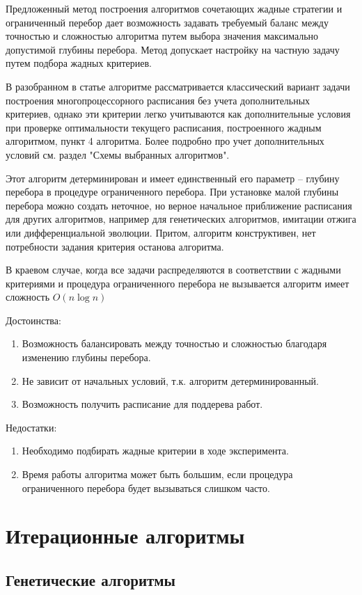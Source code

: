 \documentclass{article}
\begin{document}
Предложенный метод построения алгоритмов сочетающих жадные стратегии и ограниченный перебор дает возможность задавать требуемый баланс между точностью и сложностью алгоритма путем выбора значения максимально допустимой глубины перебора. Метод допускает настройку на частную задачу путем подбора жадных критериев. \par
В разобранном в статье \cite{Kostenko_2017} алгоритме рассматривается классический вариант задачи построения многопроцессорного расписания без учета дополнительных критериев, однако эти критерии легко учитываются как дополнительные условия при проверке оптимальности текущего расписания, построенного жадным алгоритмом, пункт 4 алгоритма. Более подробно про учет дополнительных условий см. раздел "Схемы выбранных алгоритмов".\par
Этот алгоритм детерминирован и имеет единственный его параметр – глубину перебора в процедуре ограниченного перебора. При установке малой глубины перебора можно создать неточное, но верное начальное приближение расписания для других алгоритмов, например для генетических алгоритмов, имитации отжига или дифференциальной эволюции. Притом, алгоритм конструктивен, нет потребности задания критерия останова алгоритма. \par
В краевом случае, когда все задачи распределяются в соответствии с жадными критериями и процедура ограниченного перебора не вызывается алгоритм имеет сложность $O(n\log{n})$ \par
Достоинства:
\begin{enumerate}
  \item Возможность балансировать между точностью и сложностью благодаря изменению глубины перебора.
  \item Не зависит от начальных условий, т.к. алгоритм детерминированный.
  \item Возможность получить расписание для поддерева работ.
\end{enumerate}
Недостатки:
\begin{enumerate}
  \item Необходимо подбирать жадные критерии в ходе эксперимента.
  \item Время работы алгоритма может быть большим, если процедура ограниченного перебора будет вызываться слишком часто.
\end{enumerate}
\newpage
\section{Итерационные алгоритмы}
\subsection{Генетические алгоритмы}
\end{document}
